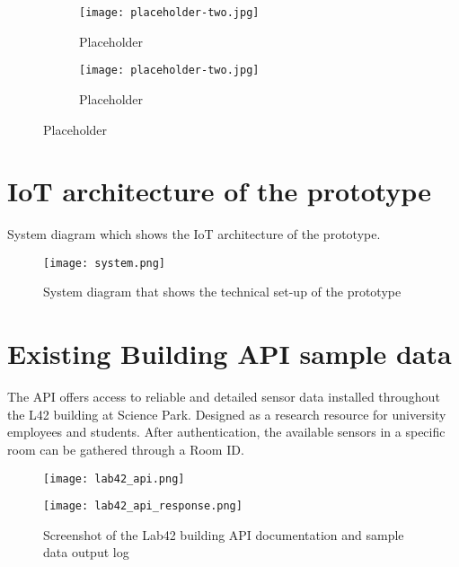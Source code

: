 \begin{appendices}
\begin{figure}[htbp]
    \centering
    \begin{subfigure}{0.48\textwidth}
        \centering
        \texttt{[image: placeholder-two.jpg]}
        \caption{Placeholder}
        \label{fig:image1}
    \end{subfigure}
    \hfill
    \begin{subfigure}{0.48\textwidth}
        \centering
        \texttt{[image: placeholder-two.jpg]}
        \caption{Placeholder}
        \label{fig:image2}
    \end{subfigure}
    \caption{Placeholder}
    \label{fig:grid}
\end{figure}

\section{IoT architecture of the prototype}
\label{appendix:architecture}

System diagram which shows the IoT architecture of the prototype.

\begin{figure}[H]
    \centering
    \texttt{[image: system.png]}
    \caption{System diagram that shows the technical set-up of the prototype}
    \label{fig:timeline}
\end{figure}

\section{Existing Building API sample data}
\label{appendix:architecture}

The API offers access to reliable and detailed sensor data installed throughout the L42 building at Science Park. Designed as a research resource for university employees and students. After authentication, the available sensors in a specific room can be gathered through a Room ID.



\begin{figure}[H]
    \centering
    \begin{minipage}{0.7\textwidth}
        \centering
        \texttt{[image: lab42\_api.png]}
    \end{minipage}%
    \begin{minipage}{0.3\textwidth}
        \centering
        \texttt{[image: lab42\_api\_response.png]}
    \end{minipage}
    \caption{Screenshot of the Lab42 building API documentation and sample data output log}
    \label{fig:timeline}
\end{figure}


\end{appendices}
